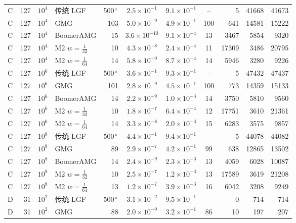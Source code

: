 \begin{longtable}{lrrlrcccrrr}
C & 127 & $10^{4}$ & 传统 LGF & 500$^\times$ & $2.5{\times}10^{-1}$ & $9.1{\times}10^{-1}$ & -- & 5 & 41668 & 41673 \\
C & 127 & $10^{4}$ & GMG & 103 & $5.0{\times}10^{-9}$ & $4.9{\times}10^{-1}$ & 100 & 641 & 14581 & 15222 \\
C & 127 & $10^{4}$ & BoomerAMG & 15 & $3.6{\times}10^{-10}$ & $9.1{\times}10^{-4}$ & 13 & 3467 & 5854 & 9320 \\
C & 127 & $10^{4}$ & M2 $w{=}\frac1{32}$ & 10 & $4.3{\times}10^{-8}$ & $2.4{\times}10^{-4}$ & 11 & 17309 & 3486 & 20795 \\
C & 127 & $10^{4}$ & M2 $w{=}\frac1{64}$ & 14 & $5.8{\times}10^{-9}$ & $8.7{\times}10^{-4}$ & 14 & 5946 & 3280 & 9226 \\
C & 127 & $10^{6}$ & 传统 LGF & 500$^\times$ & $3.6{\times}10^{-1}$ & $9.3{\times}10^{-1}$ & -- & 5 & 47432 & 47437 \\
C & 127 & $10^{6}$ & GMG & 101 & $2.8{\times}10^{-9}$ & $4.5{\times}10^{-1}$ & 100 & 773 & 14359 & 15133 \\
C & 127 & $10^{6}$ & BoomerAMG & 14 & $2.2{\times}10^{-9}$ & $1.0{\times}10^{-3}$ & 14 & 3750 & 5810 & 9560 \\
C & 127 & $10^{6}$ & M2 $w{=}\frac1{32}$ & 10 & $1.8{\times}10^{-7}$ & $6.4{\times}10^{-4}$ & 12 & 17751 & 3610 & 21361 \\
C & 127 & $10^{6}$ & M2 $w{=}\frac1{64}$ & 14 & $3.3{\times}10^{-8}$ & $2.0{\times}10^{-3}$ & 15 & 6283 & 3575 & 9857 \\
C & 127 & $10^{8}$ & 传统 LGF & 500$^\times$ & $4.4{\times}10^{-1}$ & $9.4{\times}10^{-1}$ & -- & 5 & 44078 & 44082 \\
C & 127 & $10^{8}$ & GMG & 89 & $2.9{\times}10^{-7}$ & $4.2{\times}10^{-1}$ & 99 & 638 & 12865 & 13502 \\
C & 127 & $10^{8}$ & BoomerAMG & 14 & $2.4{\times}10^{-9}$ & $2.3{\times}10^{-3}$ & 13 & 4059 & 6028 & 10087 \\
C & 127 & $10^{8}$ & M2 $w{=}\frac1{32}$ & 10 & $2.5{\times}10^{-7}$ & $1.2{\times}10^{-3}$ & 13 & 17589 & 3619 & 21208 \\
C & 127 & $10^{8}$ & M2 $w{=}\frac1{64}$ & 13 & $1.2{\times}10^{-7}$ & $3.9{\times}10^{-3}$ & 16 & 6042 & 3208 & 9249 \\
D & 31 & $10^{2}$ & 传统 LGF & 500$^\times$ & $3.1{\times}10^{-2}$ & $9.5{\times}10^{-1}$ & -- & 0 & 714 & 714 \\
D & 31 & $10^{2}$ & GMG & 88 & $2.0{\times}10^{-9}$ & $3.2{\times}10^{-1}$ & 86 & 10 & 197 & 207 \\

\end{longtable}
